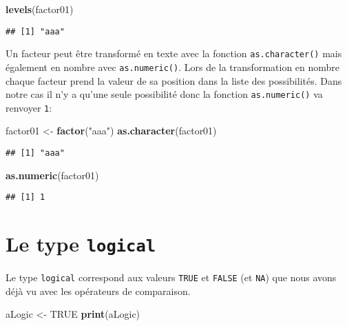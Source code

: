 \documentclass[]{book}
\newenvironment{Shaded}{\begin{snugshade}}{\end{snugshade}}
\newcommand{\KeywordTok}[1]{\textcolor[rgb]{0.13,0.29,0.53}{\textbf{#1}}}
\newcommand{\StringTok}[1]{\textcolor[rgb]{0.31,0.60,0.02}{#1}}
\newcommand{\OtherTok}[1]{\textcolor[rgb]{0.56,0.35,0.01}{#1}}
\newcommand{\NormalTok}[1]{#1}
\theoremstyle{definition}
\theoremstyle{definition}
\theoremstyle{definition}
\theoremstyle{remark}
\begin{document}
\begin{Shaded}
\begin{Highlighting}[]
\KeywordTok{levels}\NormalTok{(factor01)}
\end{Highlighting}
\end{Shaded}

\begin{verbatim}
## [1] "aaa"
\end{verbatim}

Un facteur peut être transformé en texte avec la fonction
\texttt{as.character()} mais également en nombre avec
\texttt{as.numeric()}. Lors de la transformation en nombre chaque
facteur prend la valeur de sa position dans la liste des possibilités.
Dans notre cas il n'y a qu'une seule possibilité donc la fonction
\texttt{as.numeric()} va renvoyer \texttt{1}:

\begin{Shaded}
\begin{Highlighting}[]
\NormalTok{factor01 <-}\StringTok{ }\KeywordTok{factor}\NormalTok{(}\StringTok{"aaa"}\NormalTok{)}
\KeywordTok{as.character}\NormalTok{(factor01)}
\end{Highlighting}
\end{Shaded}

\begin{verbatim}
## [1] "aaa"
\end{verbatim}

\begin{Shaded}
\begin{Highlighting}[]
\KeywordTok{as.numeric}\NormalTok{(factor01)}
\end{Highlighting}
\end{Shaded}

\begin{verbatim}
## [1] 1
\end{verbatim}

\hypertarget{l013logi}{\section{\texorpdfstring{Le type
\texttt{logical}}{Le type logical}}\label{l013logi}}

Le type \texttt{logical} correspond aux valeurs \texttt{TRUE} et
\texttt{FALSE} (et \texttt{NA}) que nous avons déjà vu avec les
opérateurs de comparaison.

\begin{Shaded}
\begin{Highlighting}[]
\NormalTok{aLogic <-}\StringTok{ }\OtherTok{TRUE}
\KeywordTok{print}\NormalTok{(aLogic)}
\end{Highlighting}
\end{Shaded}
\end{document}
